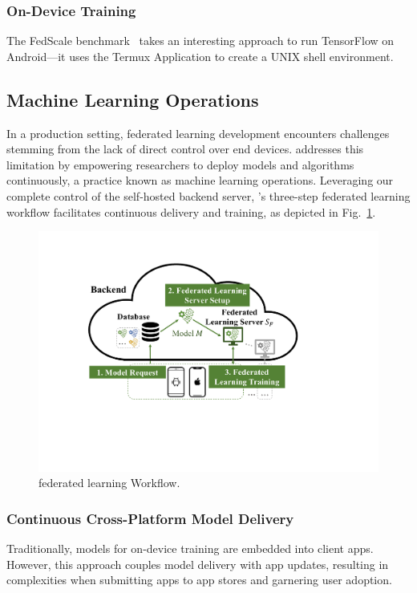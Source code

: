 \subsubsection{On-Device Training}

The FedScale benchmark~\cite{lai2022fedscale} takes an interesting approach to
run TensorFlow on Android---it uses the Termux Application to
create a UNIX shell environment.

\subsection{Machine Learning Operations}
\label{sec:mlops}

\newcommand{\model}{$M$}
\newcommand{\fs}{$S_\mathrm F$}
In a production setting,
federated learning development encounters challenges stemming from the lack of
direct control over end devices.
\fedkit addresses this limitation by empowering researchers to deploy models and
algorithms continuously, a practice known as machine learning operations.
Leveraging our complete control of the self-hosted backend server,
\fedkit's three-step federated learning workflow facilitates continuous delivery
and training, as depicted in Fig.~\ref{fig:fl-workflow}.

\begin{figure}\begin{center}
    \includegraphics[width=0.7\linewidth]{fl_workflow.pdf}
    \caption{\fedkit federated learning Workflow.}
    \label{fig:fl-workflow}
\end{center}\end{figure}

\subsubsection{Continuous Cross-Platform Model Delivery}
Traditionally, models for on-device training are embedded into client apps.
However, this approach couples model delivery with app updates,
resulting in complexities when submitting apps to app stores and garnering user
adoption.

